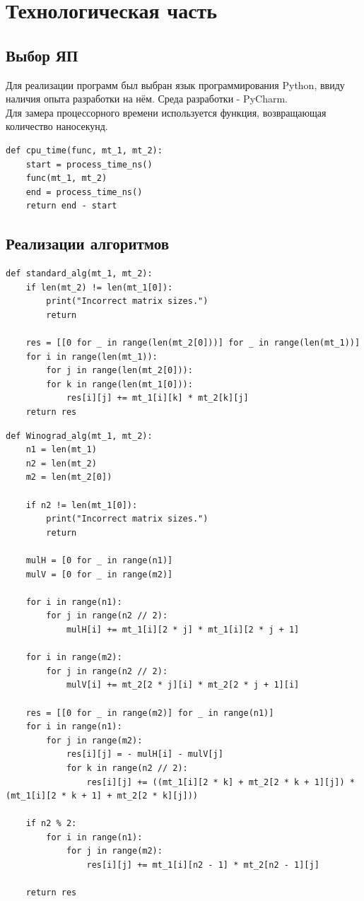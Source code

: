 \documentclass[12pt]{report}
\begin{document}
\chapter{Технологическая часть}
\section{Выбор ЯП}
Для реализации программ был выбран язык программирования Python, ввиду наличия опыта разработки на нём. Среда разработки - PyCharm. \\

Для замера процессорного времени используется функция, возвращающая количество наносекунд.\\

\begin{lstlisting}[label=some-code,caption=Функция получения процессорного времени]
def cpu_time(func, mt_1, mt_2):
	start = process_time_ns()
	func(mt_1, mt_2)
	end = process_time_ns()
	return end - start

\end{lstlisting}

\section{Реализации алгоритмов}

\begin{lstlisting}[label=some-code,caption=Функция классического умножения матриц]
def standard_alg(mt_1, mt_2):
	if len(mt_2) != len(mt_1[0]):
		print("Incorrect matrix sizes.")
		return

	res = [[0 for _ in range(len(mt_2[0]))] for _ in range(len(mt_1))]
	for i in range(len(mt_1)):
		for j in range(len(mt_2[0])):
		for k in range(len(mt_1[0])):
			res[i][j] += mt_1[i][k] * mt_2[k][j]
	return res
\end{lstlisting}


\begin{lstlisting}[label=some-code,caption=Алгоритм Винограда]
def Winograd_alg(mt_1, mt_2):
	n1 = len(mt_1)
	n2 = len(mt_2)
	m2 = len(mt_2[0])

	if n2 != len(mt_1[0]):
		print("Incorrect matrix sizes.")
		return
	
	mulH = [0 for _ in range(n1)]
	mulV = [0 for _ in range(m2)]
	
	for i in range(n1):
		for j in range(n2 // 2):
			mulH[i] += mt_1[i][2 * j] * mt_1[i][2 * j + 1]
	
	for i in range(m2):
		for j in range(n2 // 2):
			mulV[i] += mt_2[2 * j][i] * mt_2[2 * j + 1][i]
	
	res = [[0 for _ in range(m2)] for _ in range(n1)]
	for i in range(n1):
		for j in range(m2):
			res[i][j] = - mulH[i] - mulV[j]
			for k in range(n2 // 2):
				res[i][j] += ((mt_1[i][2 * k] + mt_2[2 * k + 1][j]) * (mt_1[i][2 * k + 1] + mt_2[2 * k][j]))
	
	if n2 % 2:
		for i in range(n1):
			for j in range(m2):
				res[i][j] += mt_1[i][n2 - 1] * mt_2[n2 - 1][j]
	
	return res
\end{lstlisting}
\end{document}
